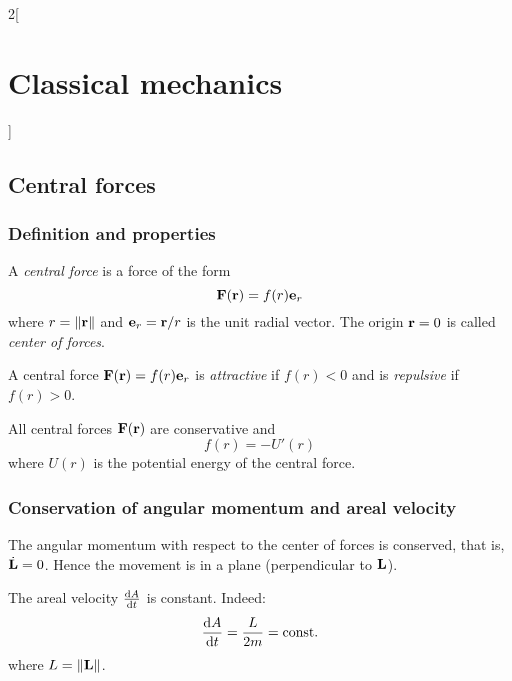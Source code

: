 \documentclass[../../../main_physics.tex]{subfiles}
\begin{document}
\begin{multicols}{2}[\section{Classical mechanics}]
  \subsection{Central forces}
  \subsubsection{Definition and properties}
  \begin{definition}
    A \emph{central force} is a force of the form
    \begin{equation}\label{CM_central-force}
      \boldsymbol{\mathrm{F}}(\boldsymbol{\mathrm{r}})=f(r)\boldsymbol{\mathrm{e}}_r
    \end{equation} where $r=\|\boldsymbol{\mathrm{r}}\|$ and $\boldsymbol{\mathrm{e}}_r=\boldsymbol{\mathrm{r}}/r$ is the unit radial vector. The origin $\boldsymbol{\mathrm{r}}=0$ is called \emph{center of forces}.
  \end{definition}
  \begin{definition}
    A central force $\boldsymbol{\mathrm{F}}(\boldsymbol{\mathrm{r}})=f(r)\boldsymbol{\mathrm{e}}_r$ is \emph{attractive} if $f(r)<0$ and is \emph{repulsive} if $f(r)>0$.
  \end{definition}
  \begin{proposition}
    All central forces $\boldsymbol{\mathrm{F}}(\boldsymbol{\mathrm{r}})$ are conservative and $$f(r)=-U'(r)$$ where $U(r)$ is the potential energy of the central force.
  \end{proposition}
  \subsubsection{Conservation of angular momentum and areal velocity}
  \begin{proposition}
    The angular momentum with respect to the center of forces is conserved, that is, $\dot{\boldsymbol{\mathrm{L}}}=0$. Hence the movement is in a plane (perpendicular to $\boldsymbol{\mathrm{L}}$).
  \end{proposition}
  \begin{proposition}
    The areal velocity $\dv{A}{t}$ is constant. Indeed: $$\dv{A}{t}=\frac{L}{2m}=\text{const.}$$ where $L=\|\boldsymbol{\mathrm{L}}\|$.
  \end{proposition}

\end{multicols}
\end{document}
